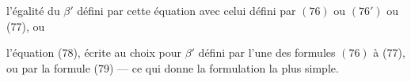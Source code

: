 l'égalité du $\beta'$ défini par cette équation avec celui défini par  $(76)$ ou $(76')$ ou (77), ou

l'équation (78), écrite au choix pour $\beta'$ défini par l'une des formules $(76)$ à (77), ou par la formule (79) --- ce qui donne la formulation la plus simple.
